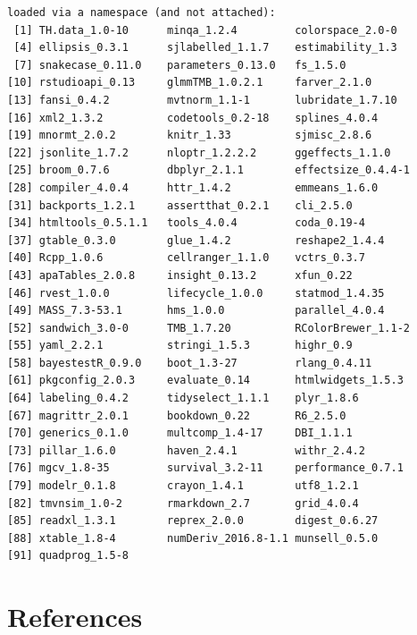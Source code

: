 \documentclass[
  english,
]{book}
\begin{document}
\begin{verbatim}
loaded via a namespace (and not attached):
 [1] TH.data_1.0-10      minqa_1.2.4         colorspace_2.0-0   
 [4] ellipsis_0.3.1      sjlabelled_1.1.7    estimability_1.3   
 [7] snakecase_0.11.0    parameters_0.13.0   fs_1.5.0           
[10] rstudioapi_0.13     glmmTMB_1.0.2.1     farver_2.1.0       
[13] fansi_0.4.2         mvtnorm_1.1-1       lubridate_1.7.10   
[16] xml2_1.3.2          codetools_0.2-18    splines_4.0.4      
[19] mnormt_2.0.2        knitr_1.33          sjmisc_2.8.6       
[22] jsonlite_1.7.2      nloptr_1.2.2.2      ggeffects_1.1.0    
[25] broom_0.7.6         dbplyr_2.1.1        effectsize_0.4.4-1 
[28] compiler_4.0.4      httr_1.4.2          emmeans_1.6.0      
[31] backports_1.2.1     assertthat_0.2.1    cli_2.5.0          
[34] htmltools_0.5.1.1   tools_4.0.4         coda_0.19-4        
[37] gtable_0.3.0        glue_1.4.2          reshape2_1.4.4     
[40] Rcpp_1.0.6          cellranger_1.1.0    vctrs_0.3.7        
[43] apaTables_2.0.8     insight_0.13.2      xfun_0.22          
[46] rvest_1.0.0         lifecycle_1.0.0     statmod_1.4.35     
[49] MASS_7.3-53.1       hms_1.0.0           parallel_4.0.4     
[52] sandwich_3.0-0      TMB_1.7.20          RColorBrewer_1.1-2 
[55] yaml_2.2.1          stringi_1.5.3       highr_0.9          
[58] bayestestR_0.9.0    boot_1.3-27         rlang_0.4.11       
[61] pkgconfig_2.0.3     evaluate_0.14       htmlwidgets_1.5.3  
[64] labeling_0.4.2      tidyselect_1.1.1    plyr_1.8.6         
[67] magrittr_2.0.1      bookdown_0.22       R6_2.5.0           
[70] generics_0.1.0      multcomp_1.4-17     DBI_1.1.1          
[73] pillar_1.6.0        haven_2.4.1         withr_2.4.2        
[76] mgcv_1.8-35         survival_3.2-11     performance_0.7.1  
[79] modelr_0.1.8        crayon_1.4.1        utf8_1.2.1         
[82] tmvnsim_1.0-2       rmarkdown_2.7       grid_4.0.4         
[85] readxl_1.3.1        reprex_2.0.0        digest_0.6.27      
[88] xtable_1.8-4        numDeriv_2016.8-1.1 munsell_0.5.0      
[91] quadprog_1.5-8     
\end{verbatim}

\hypertarget{refs}{%
\chapter*{References}\label{refs}}

  
\end{document}
